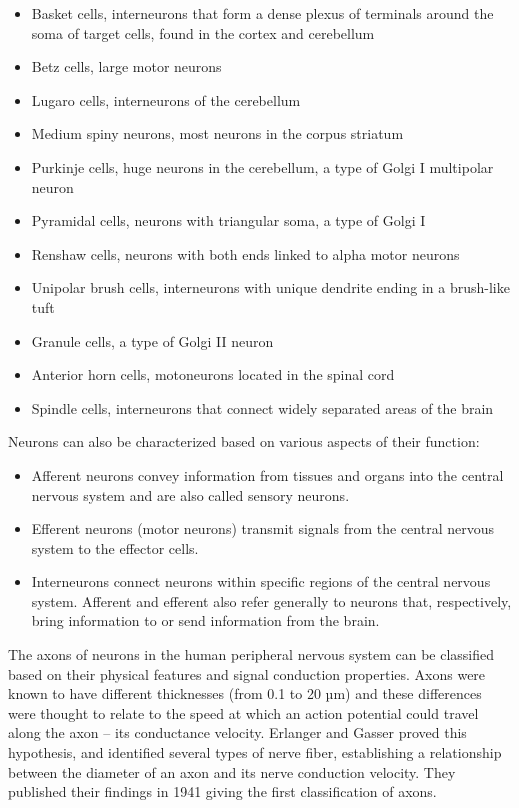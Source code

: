 \begin{itemize}
\tightlist
\item
  Basket cells, interneurons that form a dense plexus of terminals around the soma of target cells, found in the cortex and cerebellum
\item
  Betz cells, large motor neurons
\item
  Lugaro cells, interneurons of the cerebellum
\item
  Medium spiny neurons, most neurons in the corpus striatum
\item
  Purkinje cells, huge neurons in the cerebellum, a type of Golgi I multipolar neuron
\item
  Pyramidal cells, neurons with triangular soma, a type of Golgi I
\item
  Renshaw cells, neurons with both ends linked to alpha motor neurons
\item
  Unipolar brush cells, interneurons with unique dendrite ending in a brush-like tuft
\item
  Granule cells, a type of Golgi II neuron
\item
  Anterior horn cells, motoneurons located in the spinal cord
\item
  Spindle cells, interneurons that connect widely separated areas of the brain
\end{itemize}

Neurons can also be characterized based on various aspects of their function:

\begin{itemize}
\tightlist
\item
  Afferent neurons convey information from tissues and organs into the central nervous system and are also called sensory neurons.
\item
  Efferent neurons (motor neurons) transmit signals from the central nervous system to the effector cells.
\item
  Interneurons connect neurons within specific regions of the central nervous system.
  Afferent and efferent also refer generally to neurons that, respectively, bring information to or send information from the brain.
\end{itemize}

The axons of neurons in the human peripheral nervous system can be classified based on their physical features and signal conduction properties. Axons were known to have different thicknesses (from 0.1 to 20 µm) and these differences were thought to relate to the speed at which an action potential could travel along the axon -- its conductance velocity. Erlanger and Gasser proved this hypothesis, and identified several types of nerve fiber, establishing a relationship between the diameter of an axon and its nerve conduction velocity. They published their findings in 1941 giving the first classification of axons.

